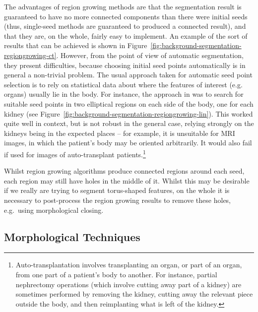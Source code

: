 
The advantages of region growing methods are that the segmentation result is guaranteed to have no more connected components than there were initial seeds (thus, single-seed methods are guaranteed to produced a connected result), and that they are, on the whole, fairly easy to implement. An example of the sort of results that can be achieved is shown in Figure~\ref{fig:background-segmentation-regiongrowing-ct}. However, from the point of view of automatic segmentation, they present difficulties, because choosing initial seed points automatically is in general a non-trivial problem. The usual approach taken for automatic seed point selection is to rely on statistical data about where the features of interest (e.g. organs) usually lie in the body. For instance, the approach in \cite{lin06} was to search for suitable seed points in two elliptical regions on each side of the body, one for each kidney (see Figure~\ref{fig:background-segmentation-regiongrowing-lin}). This worked quite well in context, but is not robust in the general case, relying strongly on the kidneys being in the expected places -- for example, it is unsuitable for MRI images, in which the patient's body may be oriented arbitrarily. It would also fail if used for images of auto-transplant patients.\footnote{Auto-transplantation involves transplanting an organ, or part of an organ, from one part of a patient's body to another. For instance, partial nephrectomy operations (which involve cutting away part of a kidney) are sometimes performed by removing the kidney, cutting away the relevant piece outside the body, and then reimplanting what is left of the kidney.}

Whilst region growing algorithms produce connected regions around each seed, each region may still have holes in the middle of it. Whilst this may be desirable if we really are trying to segment torus-shaped features, on the whole it is necessary to post-process the region growing results to remove these holes, e.g.~using morphological closing.

\subsection{Morphological Techniques}
\label{subsec:background-segmentation-morphology}

